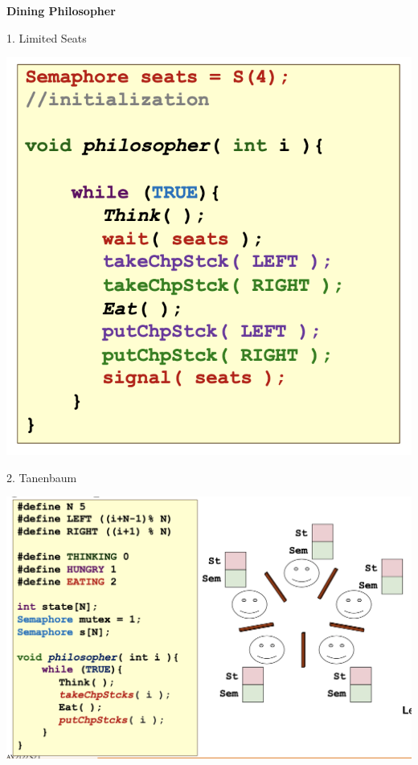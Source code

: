 \documentclass[10pt, a4paper]{article}
\begin{document}
\begin{multicols*}{3}
		\textbf{Dining Philosopher}

		1. Limited Seats

		\includegraphics[scale=0.37]{./assets/limitedSeats.png}

		2. Tanenbaum

		\includegraphics[scale=.38]{./assets/tanenbaum1.png}


\end{multicols*}
\end{document}
